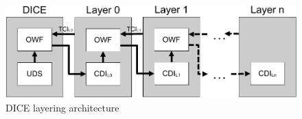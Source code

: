 \begin{figure}[htpb]
  \centering
  \includegraphics[width=1\linewidth]{figures/dice-layers.pdf}
  \caption{DICE layering architecture} \label{fig:dice-layers}
\end{figure}

